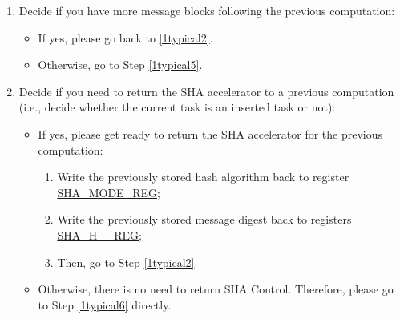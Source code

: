 \documentclass[main\_\_EN.tex]{subfiles}
\begin{document}
\begin{enumerate}
\begin{itemize}
            \item If yes, please get ready for handing over the SHA accelerator to the new task:
            \begin{enumerate}
            \item Read and store the hash algorithm selected for the current computation stored in the \hyperref[regdesc:SHAMODEREG]{SHA\_MODE\_REG} register;
            \item Read and store the message digest stored in registers \hyperref[regdesc:SHAHNREG]{SHA\_H\_\_REG};
            \item Last, please go to perform the inserted computation. For the detailed process of the inserted computation, please refer to \hyperref[subsection:typicalsha]{Typical SHA} or \hyperref[subsection:dma-sha]{DMA-SHA}, depending on the working mode.
            \end{enumerate}
            \item Otherwise, please continue to execute Step \ref{1typical4}.
        \end{itemize}

    \item \label{1typical4}
    Decide if you have more message blocks following the previous computation:
        \begin{itemize}
            \item If yes, please go back to \ref{1typical2}.
            \item Otherwise, go to Step \ref{1typical5}.
            \end{itemize}

    \item \label{1typical5} Decide if you need to return the SHA accelerator to a previous computation (i.e., decide whether the current task is an inserted task or not):
        \begin{itemize}
            \item If yes, please get ready to return the SHA accelerator for the previous computation:
            \begin{enumerate}
                \item Write the previously stored hash algorithm back to register \hyperref[regdesc:SHAMODEREG]{SHA\_MODE\_REG};
                \item Write the previously stored message digest back to registers \hyperref[regdesc:SHAHNREG]{SHA\_H\_\_REG};
                \item Then, go to Step \ref{1typical2}.
            \end{enumerate}
            \item Otherwise, there is no need to return SHA Control. Therefore, please go to Step \ref{1typical6} directly.
        \end{itemize}


\end{enumerate}
\end{document}
